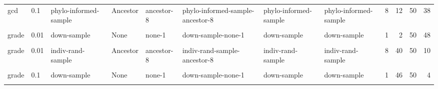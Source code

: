 \documentclass[
]{book}
\begin{document}
\begin{table}
\begin{tabular}{l|l|l|l|l|l|l|l|l|r|r|r}
\cellcolor{gray!6}{gcd} & \cellcolor{gray!6}{0.1} & \cellcolor{gray!6}{indiv-rand-sample} & \cellcolor{gray!6}{Ancestor} & \cellcolor{gray!6}{ancestor-8} & \cellcolor{gray!6}{indiv-rand-sample-ancestor-8} & \cellcolor{gray!6}{indiv-rand-sample} & \cellcolor{gray!6}{indiv-rand-sample} & \cellcolor{gray!6}{8} & \cellcolor{gray!6}{12} & \cellcolor{gray!6}{50} & \cellcolor{gray!6}{38}\\
\hline
gcd & 0.1 & phylo-informed-sample & Ancestor & ancestor-8 & phylo-informed-sample-ancestor-8 & phylo-informed-sample & phylo-informed-sample & 8 & 12 & 50 & 38\\
\hline
\cellcolor{gray!6}{gcd} & \cellcolor{gray!6}{1} & \cellcolor{gray!6}{full} & \cellcolor{gray!6}{None} & \cellcolor{gray!6}{none-1} & \cellcolor{gray!6}{full-none-1} & \cellcolor{gray!6}{full} & \cellcolor{gray!6}{full} & \cellcolor{gray!6}{1} & \cellcolor{gray!6}{1} & \cellcolor{gray!6}{100} & \cellcolor{gray!6}{99}\\
\hline
grade & 0.01 & down-sample & None & none-1 & down-sample-none-1 & down-sample & down-sample & 1 & 2 & 50 & 48\\
\hline
\cellcolor{gray!6}{grade} & \cellcolor{gray!6}{0.01} & \cellcolor{gray!6}{down-sample} & \cellcolor{gray!6}{Ancestor} & \cellcolor{gray!6}{ancestor-8} & \cellcolor{gray!6}{down-sample-ancestor-8} & \cellcolor{gray!6}{down-sample} & \cellcolor{gray!6}{down-sample-ancestor} & \cellcolor{gray!6}{8} & \cellcolor{gray!6}{35} & \cellcolor{gray!6}{50} & \cellcolor{gray!6}{15}\\
\hline
grade & 0.01 & indiv-rand-sample & Ancestor & ancestor-8 & indiv-rand-sample-ancestor-8 & indiv-rand-sample & indiv-rand-sample & 8 & 40 & 50 & 10\\
\hline
\cellcolor{gray!6}{grade} & \cellcolor{gray!6}{0.01} & \cellcolor{gray!6}{phylo-informed-sample} & \cellcolor{gray!6}{Ancestor} & \cellcolor{gray!6}{ancestor-8} & \cellcolor{gray!6}{phylo-informed-sample-ancestor-8} & \cellcolor{gray!6}{phylo-informed-sample} & \cellcolor{gray!6}{phylo-informed-sample} & \cellcolor{gray!6}{8} & \cellcolor{gray!6}{41} & \cellcolor{gray!6}{50} & \cellcolor{gray!6}{9}\\
\hline
grade & 0.1 & down-sample & None & none-1 & down-sample-none-1 & down-sample & down-sample & 1 & 46 & 50 & 4\\
\hline
\cellcolor{gray!6}{grade} & \cellcolor{gray!6}{0.1} & \cellcolor{gray!6}{down-sample} & \cellcolor{gray!6}{Ancestor} & \cellcolor{gray!6}{ancestor-8} & \cellcolor{gray!6}{down-sample-ancestor-8} & \cellcolor{gray!6}{down-sample} & \cellcolor{gray!6}{down-sample-ancestor} & \cellcolor{gray!6}{8} & \cellcolor{gray!6}{40} & \cellcolor{gray!6}{50} & \cellcolor{gray!6}{10}\\

\end{tabular}
\end{table}
\end{document}
